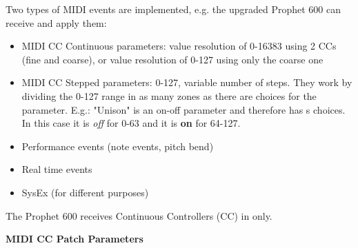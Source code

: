 Two types of MIDI events are implemented, e.g. the upgraded Prophet 600 can receive and apply them:

\begin{itemize}
  \setlength\itemsep{0cm}
  \item MIDI CC Continuous parameters: value resolution of 0-16383 using 2 CCs (fine and coarse), or value resolution of 0-127 using only the coarse one
  \item MIDI CC Stepped parameters: 0-127, variable number of steps. They work by dividing the 0-127 range in as many zones as there are choices for the parameter. E.g.: "Unison" is an on-off parameter and therefore has s choices. In this case it is \textit{off} for 0-63 and it is \textbf{on} for 64-127.
  \item Performance events (note events, pitch bend)
  \item Real time events
  \item SysEx (for different purposes)
\end{itemize}

The Prophet 600 receives Continuous Controllers (CC) in \presetmode only. 

\textbf{MIDI CC Patch Parameters} 

\footnotesize
\renewcommand{\arraystretch}{1.3}

